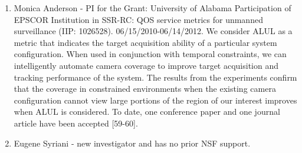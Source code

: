 \begin{enumerate}
\item Monica Anderson  - PI for the Grant: University of Alabama Participation of EPSCOR Institution in SSR-RC: QOS service metrics for unmanned surveillance (IIP: 1026528).  06/15/2010-06/14/2012. We consider ALUL as a metric that indicates the target acquisition ability of a particular system configuration. When used in conjunction with temporal constraints, we can intelligently automate camera coverage to improve target acquisition and tracking performance of the system. The results from the experiments confirm that the coverage in constrained environments when the existing camera configuration cannot view large portions of the region of our interest improves when ALUL is considered.  To date, one conference paper and one journal article have been accepted [59-60].
\item Eugene Syriani - new investigator and has no prior NSF support.

\end{enumerate}
